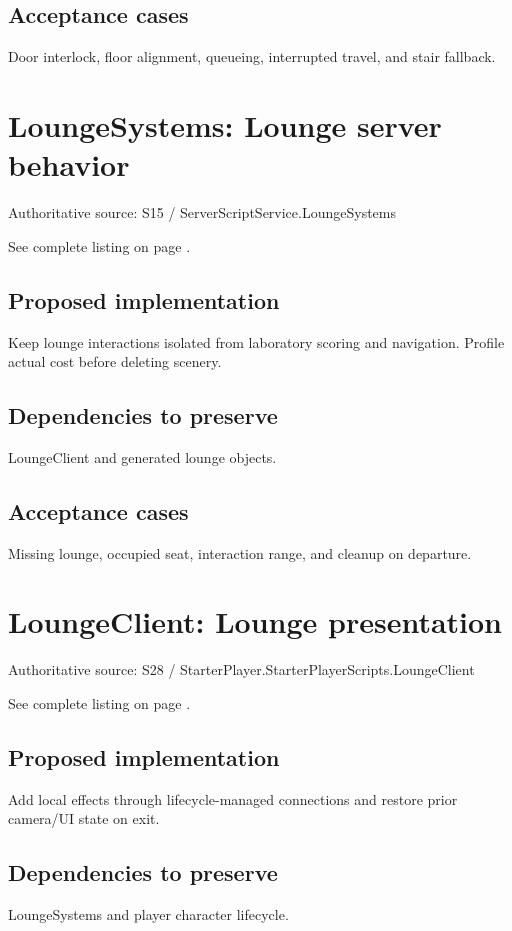 \subsection{Acceptance cases}
Door interlock, floor alignment, queueing, interrupted travel, and stair fallback.\allowbreak{}

\section{LoungeSystems: Lounge server behavior}
Authoritative source: S15 /\allowbreak{} ServerScriptService.\allowbreak{}LoungeSystems

See complete listing on page \pageref{src:S15}.

\subsection{Proposed implementation}
Keep lounge interactions isolated from laboratory scoring and navigation.\allowbreak{} Profile actual cost before deleting scenery.\allowbreak{}

\subsection{Dependencies to preserve}
LoungeClient and generated lounge objects.\allowbreak{}

\subsection{Acceptance cases}
Missing lounge, occupied seat, interaction range, and cleanup on departure.\allowbreak{}

\section{LoungeClient: Lounge presentation}
Authoritative source: S28 /\allowbreak{} StarterPlayer.\allowbreak{}StarterPlayerScripts.\allowbreak{}LoungeClient

See complete listing on page \pageref{src:S28}.

\subsection{Proposed implementation}
Add local effects through lifecycle-managed connections and restore prior camera/\allowbreak{}UI state on exit.\allowbreak{}

\subsection{Dependencies to preserve}
LoungeSystems and player character lifecycle.\allowbreak{}

